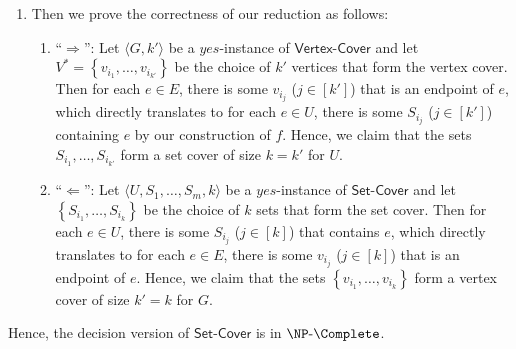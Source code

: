 {\begin{enumerate}
\begin{enumerate}
        \item Define $m = |V|$ and let $n = m$, which means the number of sets equals the number of vertices in $G$.
        \item Label elements in $V$ as $V = \left\{v_1, v_2, \dots, v_m\right\}$. For each $i \in \left\{1, \dots, m \right\}$, the set $S_i$ is defined as $S_i = \left\{ e \in E \: \middle| \: e = (v_i, u) \text{ for some } u \in V \setminus \left\{v\right\} \right\}$. In other word, $S_i$ is the set of edges incident to $v_i$.
        \item $k = k'$.
    \end{enumerate}
    Our reduction takes polynomial time because:
    \begin{enumerate}
        \item Generating each $S_i$ just takes polynomial time since each edge is visited twice (once for each endpoint).
        \item Generating $U$ and $k$ trivially takes polynomial time because they are copied directly from the input.
    \end{enumerate}
    \item Then we prove the correctness of our reduction as follows:
    \begin{enumerate}
        \item ``$\Rightarrow$'': Let $\langle G, k' \rangle$ be a $yes$-instance of $\mathsf{Vertex\text{-}Cover}$ and let $V^* = \left\{v_{i_1}, \dots, v_{i_{k'}}\right\}$ be the choice of $k'$ vertices that form the vertex cover. Then for each $e \in E$, there is some $v_{i_j}$ ($j \in [k']$) that is an endpoint of $e$, which directly translates to for each $e \in U$, there is some $S_{i_j}$ ($j \in [k']$) containing $e$ by our construction of $f$. Hence, we claim that the sets $S_{i_1}, \dots, S_{i_{k'}}$ form a set cover of size $k = k'$ for $U$.
        \item ``$\Leftarrow$'': Let $\langle{U, S_1, \ldots, S_m, k \rangle}$ be a $yes$-instance of $\mathsf{Set \text{-} Cover}$ and let $\left\{S_{i_1}, \dots, S_{i_k}\right\}$ be the choice of $k$ sets that form the set cover. Then for each $e \in U$, there is some $S_{i_j}$ ($j \in [k]$) that contains $e$, which directly translates to for each $e \in E$, there is some $v_{i_j}$ ($j \in [k]$) that is an endpoint of $e$. Hence, we claim that the sets $\left\{v_{i_1}, \dots, v_{i_k}\right\}$ form a vertex cover of size $k' = k$ for $G$.
    \end{enumerate}
  \end{enumerate}
  Hence, the decision version of $\mathsf{Set\text{-}Cover}$ is in $\NP \text{-} \Complete$.
}